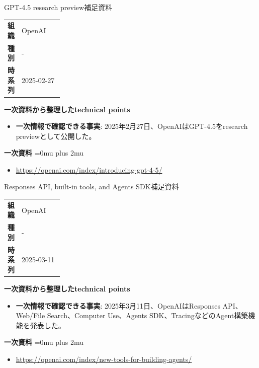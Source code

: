 \begin{technicalnote}{GPT-4.5 research preview}{補足資料}
\begingroup
\begin{tabularx}{\linewidth}{@{}>{\bfseries}p{0.22\linewidth}X@{}}
組織 & OpenAI \\
種別 & - \\
時系列 & 2025-02-27 \\
\end{tabularx}
\smallskip
{\bfseries 一次資料から整理したtechnical points}
\begin{itemize}[leftmargin=1.5em,itemsep=0.35em]
\item \textbf{一次情報で確認できる事実}: 2025年2月27日、OpenAIはGPT-4.5をresearch previewとして公開した。
\end{itemize}
\begin{samepage}
{\bfseries 一次資料}
\begingroup\sloppy
\Urlmuskip=0mu plus 2mu\relax
\begin{itemize}[leftmargin=1.5em,itemsep=0.25em]
\item {\scriptsize\url{https://openai.com/index/introducing-gpt-4-5/}}
\end{itemize}
\endgroup
\end{samepage}
\endgroup
\end{technicalnote}
\medskip

\begin{technicalnote}{Responses API, built-in tools, and Agents SDK}{補足資料}
\begingroup
\begin{tabularx}{\linewidth}{@{}>{\bfseries}p{0.22\linewidth}X@{}}
組織 & OpenAI \\
種別 & - \\
時系列 & 2025-03-11 \\
\end{tabularx}
\smallskip
{\bfseries 一次資料から整理したtechnical points}
\begin{itemize}[leftmargin=1.5em,itemsep=0.35em]
\item \textbf{一次情報で確認できる事実}: 2025年3月11日、OpenAIはResponses API、Web/File Search、Computer Use、Agents SDK、TracingなどのAgent構築機能を発表した。
\end{itemize}
\begin{samepage}
{\bfseries 一次資料}
\begingroup\sloppy
\Urlmuskip=0mu plus 2mu\relax
\begin{itemize}[leftmargin=1.5em,itemsep=0.25em]
\item {\scriptsize\url{https://openai.com/index/new-tools-for-building-agents/}}
\end{itemize}
\endgroup
\end{samepage}
\endgroup
\end{technicalnote}
\medskip


